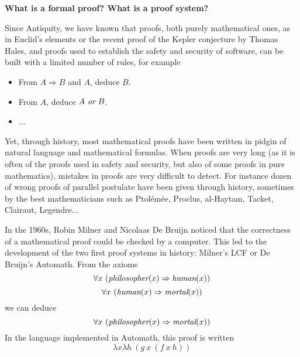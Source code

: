 \begin{framed}
  \begin{center}
    {\bf \Large What is a formal proof? What is a proof system?}
    \end{center}
        
Since Antiquity, we have known that
proofs, both purely mathematical ones, as in Euclid's elements or the
recent proof of the Kepler conjecture by Thomas Hales, and proofs used
to establish the safety and security of software, can be built with a
limited number of rules, for example
\begin{itemize}
\item From $A \Rightarrow B$ and $A$, deduce $B$.
\item From $A$, deduce $A~\mbox{\it or}~B$.
\item ...
\end{itemize}
Yet, through history, most mathematical proofs have been written in
pidgin of natural language and mathematical formulas. When proofs are
very long (as it is often of the proofs used in safety and security,
but also of some proofs in pure mathematics), mistakes in proofs are
very difficult to detect. For instance dozen of wrong proofs of
parallel postulate have been given through history, sometimes by the
best mathematicians such as Ptolémée, Proclus, al-Haytam, Tacket,
Clairaut, Legendre...

In the 1960s, Robin Milner and Nicolaas De Bruijn noticed that the
correctness of a mathematical proof could be checked by a
computer. This led to the development of the two first proof systems
in history: Milner's LCF or De Bruijn's Automath.  From
the axioms
$$\forall x~(\mbox{\em philosopher}(x) \Rightarrow \mbox{\em human}(x))$$
$$\forall x~(\mbox{\em human}(x) \Rightarrow \mbox{\em mortal}(x))$$
we can deduce
$$\forall x~(\mbox{\em philosopher}(x) \Rightarrow \mbox{\em mortal}(x))$$
In the language implemented in Automath, this proof is written
$$\lambda x \lambda h~(g~x~(f~x~h))$$
\end{framed}

